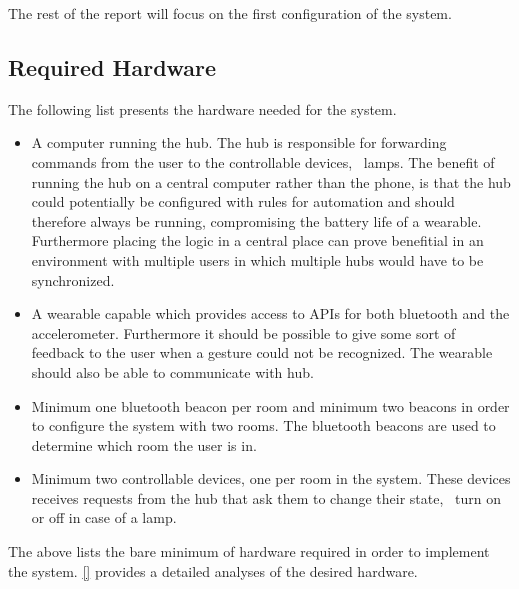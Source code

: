 
The rest of the report will focus on the first configuration of the system.

\subsection{Required Hardware}
\label{sec:analysis:system-components:required-hardware}

The following list presents the hardware needed for the system.

\begin{itemize}
\item A computer running the hub. The hub is responsible for forwarding commands from the user to the controllable devices, \eg~lamps. The benefit of running the hub on a central computer rather than the phone, is that the hub could potentially be configured with rules for automation and should therefore always be running, compromising the battery life of a wearable. Furthermore placing the logic in a central place can prove benefitial in an environment with multiple users in which multiple hubs would have to be synchronized.
\item A wearable capable which provides access to APIs for both bluetooth and the accelerometer. Furthermore it should be possible to give some sort of feedback to the user when a gesture could not be recognized. The wearable should also be able to communicate with hub.
\item Minimum one bluetooth beacon per room and minimum two beacons in order to configure the system with two rooms. The bluetooth beacons are used to determine which room the user is in.
\item Minimum two controllable devices, one per room in the system. These devices receives requests from the hub that ask them to change their state, \eg~turn on or off in case of a lamp.
\end{itemize}

The above lists the bare minimum of hardware required in order to implement the system. \cref{} provides a detailed analyses of the desired hardware. 

